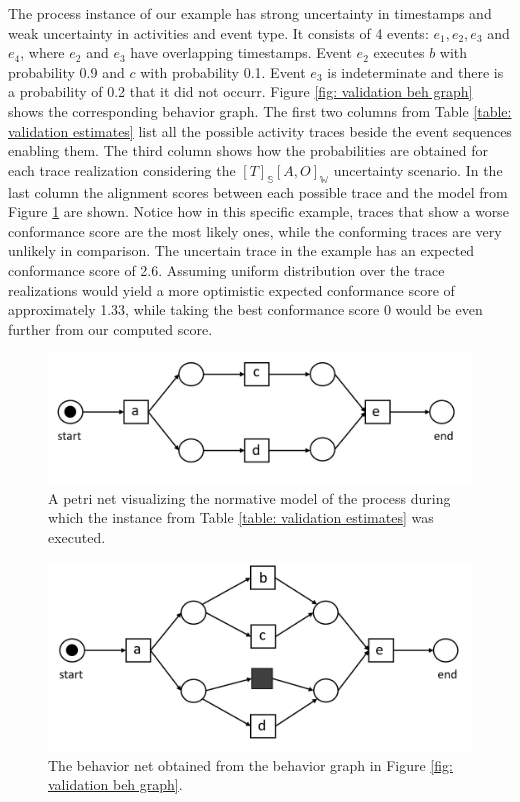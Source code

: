 The process instance of our example has strong uncertainty in timestamps and weak uncertainty in activities and event type.
It consists of 4 events: $e_1,e_2,e_3$ and $e_4$, where $e_2$ and $e_3$ have overlapping timestamps.
Event $e_2$ executes $b$ with probability 0.9 and $c$ with probability 0.1.
Event $e_3$ is indeterminate and there is a probability of 0.2 that it did not occurr.
Figure \ref{fig: validation beh graph} shows the corresponding behavior graph.
The first two columns from Table \ref{table: validation estimates} list all the possible activity traces beside the event sequences enabling them.
The third column shows how the probabilities are obtained for each trace realization considering the $[T]_{\mathbb{S}}[A,O]_{\mathbb{W}}$ uncertainty scenario.
In the last column the alignment scores between each possible trace and the model from Figure \ref{fig: validation model} are shown.
Notice how in this specific example, traces that show a worse conformance score are the most likely ones, while the conforming traces are very unlikely in comparison.
The uncertain trace in the example has an expected conformance score of 2.6.
Assuming uniform distribution over the trace realizations would yield a more optimistic expected conformance score of approximately 1.33, while taking the best conformance score 0 would be even further from our computed score.
%
%
%
\begin{figure}
	\centering
	\includegraphics[width=0.8\columnwidth]{figures/model_validation.png}
	\caption{A petri net visualizing the normative model of the process during which the instance from Table \ref{table: validation estimates} was executed.}
	\label{fig: validation model}
\end{figure}
%
%
%
%
%
%
\begin{figure}
	\centering
	\includegraphics[width=0.8\columnwidth]{figures/behaviornet.png}
	\caption{The behavior net obtained from the behavior graph in Figure \ref{fig: validation beh graph}.}
	\label{fig: behavior net}
\end{figure}
